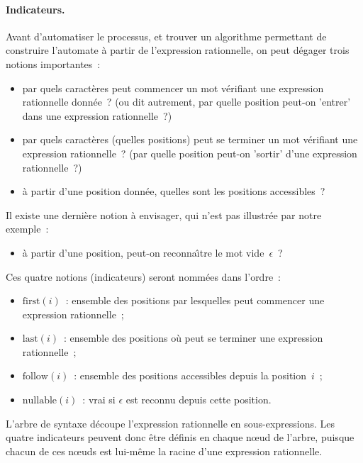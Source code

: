 \paragraph{Indicateurs.}
Avant d'automatiser le processus, et trouver un algorithme permettant de construire l'automate {\`a} partir
de l'expression rationnelle, on peut d{\'e}gager trois notions importantes~: 
\begin{itemize}
\item par quels caract{\`e}res peut commencer un mot v{\'e}rifiant une expression rationnelle donn{\'e}e~? (ou dit autrement, par quelle position peut-on 'entrer' dans une expression rationnelle~?)
\item par quels caract{\`e}res (quelles positions) peut se terminer un mot v{\'e}rifiant une expression rationnelle~? 
(par quelle position peut-on 'sortir' d'une expression rationnelle~?)
\item \`a partir d'une position donn{\'e}e, quelles sont les positions accessibles~? 
\end{itemize}
Il existe une derni{\`e}re notion {\`a} envisager, qui n'est pas illustr\'ee par notre exemple~: 
\begin{itemize}
\item \`a partir d'une position, peut-on reconna{\^\i}tre le mot vide~$\epsilon$~? 
\end{itemize}
\begin{definition}
Ces quatre notions (indicateurs) seront nomm{\'e}es dans l'ordre~: 
\begin{itemize}
\item $\mbox{first}(i)$~: ensemble des positions par lesquelles peut commencer une expression rationnelle~;
\item $\mbox{last}(i)$~: ensemble des positions o{\`u} peut se terminer une expression rationnelle~;
\item $\mbox{follow}(i)$~: ensemble des positions accessibles depuis la position~$i$~;
\item $\mbox{nullable}(i)$~: vrai si $\epsilon$ est reconnu depuis cette position. 
\end{itemize}
\end{definition}
L'arbre de syntaxe d{\'e}coupe l'expression rationnelle en sous-expressions. Les quatre indicateurs peuvent donc {\^e}tre d{\'e}finis en chaque n\oe ud de l'arbre, puisque chacun de ces n\oe{}uds est lui-m{\^e}me la racine d'une expression rationnelle.

